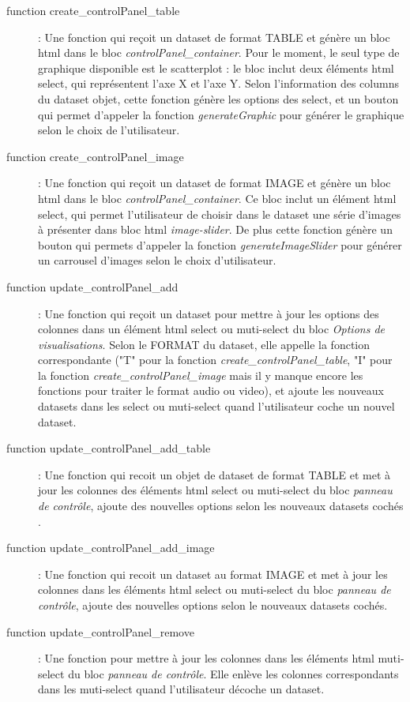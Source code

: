 \documentclass[a4paper]{report}
\begin{document}
\begin{description}
	\item[function create\_controlPanel\_table]: Une fonction qui reçoit un dataset de format TABLE et génère un bloc html dans le bloc \emph{controlPanel\_container}. Pour le moment, le seul type de graphique disponible est le scatterplot : le bloc inclut deux éléments html select, qui représentent l'axe X et l'axe Y. Selon l'information des columns du dataset objet, cette fonction génère les options des select, et un bouton qui permet d'appeler la fonction \emph{generateGraphic} pour générer le graphique selon le choix de l'utilisateur.
	
	\item[function create\_controlPanel\_image]: Une fonction qui reçoit un dataset de format IMAGE et génère un bloc html dans le bloc \emph{controlPanel\_container}. Ce bloc inclut un élément html select, qui permet l'utilisateur de choisir dans le dataset une série d'images à présenter dans bloc html \emph{image-slider}. De plus cette fonction génère un bouton qui permets d'appeler la fonction \emph{generateImageSlider} pour générer un carrousel d'images selon le choix d'utilisateur.
	
	\item[function update\_controlPanel\_add]: Une fonction qui reçoit un dataset pour mettre à jour les options des colonnes dans un élément html select ou muti-select du bloc \emph{Options de visualisations}. Selon le FORMAT du dataset, elle appelle la fonction correspondante ("T" pour la fonction \emph{create\_controlPanel\_table}, "I" pour la fonction \emph{create\_controlPanel\_image} mais il y manque encore les fonctions pour traiter le format audio ou video), et ajoute les nouveaux datasets dans les select ou muti-select quand l'utilisateur coche un nouvel dataset. 
	
	\item[function update\_controlPanel\_add\_table]: Une fonction qui recoit un objet de dataset de format TABLE et met à jour les colonnes des éléments html select ou muti-select du bloc \emph{panneau de contrôle}, ajoute des nouvelles options selon les nouveaux datasets cochés .
	
	\item[function update\_controlPanel\_add\_image]: Une fonction qui recoit un dataset au format IMAGE et met à jour les colonnes dans les éléments html select ou muti-select du bloc \emph{panneau de contrôle}, ajoute des nouvelles options selon le nouveaux datasets cochés.
	
	\item[function update\_controlPanel\_remove]: Une fonction pour mettre à jour les colonnes dans les éléments html muti-select du bloc \emph{panneau de contrôle}. Elle enlève les colonnes correspondants dans les muti-select quand l'utilisateur décoche un dataset.
	

\end{description}
\end{document}
